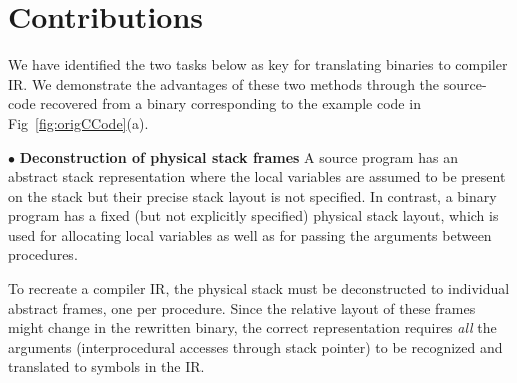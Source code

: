 \vspace{-1ex}
\section{Contributions}
\label{sec:contributions}
We have identified the two tasks below as key for translating binaries to compiler IR. We demonstrate the advantages of these two methods through the source-code recovered from a binary corresponding to the example code in Fig~\ref{fig:origCCode}(a).

\noindent $\bullet$ \textbf{Deconstruction of physical stack frames} A source program has an abstract stack representation where the local variables are assumed to be present on the stack but their precise stack layout is not specified. In contrast, a binary program has a fixed (but not explicitly specified) physical stack layout, which is used for allocating local variables as well as for passing the arguments between procedures.

To recreate a compiler IR, the physical stack must be deconstructed to individual abstract frames, one per procedure. Since the relative
layout of these frames might change in the rewritten binary, the correct representation requires \emph{all} the arguments (interprocedural accesses through stack pointer) to be recognized and translated to symbols in the IR.


